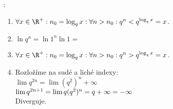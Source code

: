 		:
		\begin{enumerate}
			\item $\forall x\in\R^+:n_0=\log_q x:\forall n>n_0: q^n
				< q^{\log_q x} = x$.
			\item $\ln q^n = \ln 1^n \ln 1 = $
			\item $\forall x\in\R^+:n_0=\log_q x:\forall n>n_0: q^n
				> q^{\log_q x} = x$.
			\item Rozložíme na sudé a liché indexy:\\
				$\lim q^{2n} =\lim (q^2)^n +\infty$\\
				$\lim q^{2n+1} =\lim q (q^2)^n = q\* +\infty =
				-\infty$\\
				Diverguje.
		\end{enumerate}









\EndDoc
